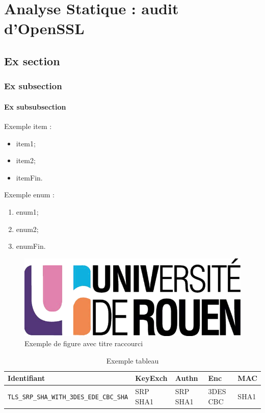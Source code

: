 \chapter{Analyse Statique : audit d'OpenSSL}

\section{Ex section}
\subsection{Ex subsection}
\subsubsection{Ex subsubsection}


Exemple item  :
\begin{itemize}
\item item1;
\item item2;
\item itemFin.\\
\end{itemize}

Exemple enum : 
\begin{enumerate}
\item enum1;
\item enum2;
\item enumFin.\\
\end{enumerate}


\begin{figure}[H]
\begin{center}
\includegraphics[scale=0.2]{images/logo_univ.png}
\end{center}
\caption[Exemple 1]{Exemple de figure avec titre raccourci}
\label{fig1}
\end{figure}


\begin{table}
\centering
\begin{tabularx}{17cm}{|l|l|l|X|l|}
\hline
\textbf{Identifiant} & \textbf{KeyExch} & \textbf{Authn}& \textbf{Enc}& \textbf{MAC}\\
\hline
\verb+TLS_SRP_SHA_WITH_3DES_EDE_CBC_SHA+&SRP SHA1&SRP SHA1&3DES CBC&SHA1\\
\hline
\end{tabularx}
\caption{Exemple tableau}
\label{tableauEx}
\end{table}

